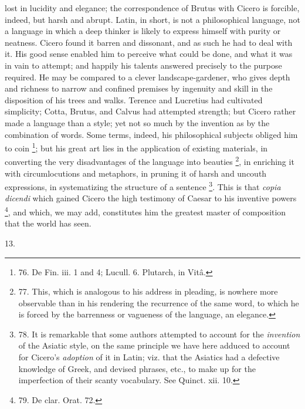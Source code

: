 lost in lucidity and elegance; the correspondence of Brutus with
Cicero is forcible, indeed, but harsh and abrupt. Latin, in short, is
not a philosophical language, not a language in which a deep thinker
is likely to express himself with purity or neatness. Cicero found it
barren and dissonant, and as such he had to deal with it. His good
sense enabled him to perceive what could be done, and what it was in
vain to attempt; and happily his talents answered precisely to the
purpose required. He may be compared to a clever landscape-gardener,
who gives depth and richness to narrow and confined premises by
ingenuity and skill in the disposition of his trees and walks. Terence
and Lucretius had cultivated simplicity; Cotta, Brutus, and Calvus had
attempted strength; but Cicero rather made a language than a style;
yet not so much by the invention as by the combination of words. Some
terms, indeed, his philosophical subjects obliged him to coin \footnote{76. De Fin. iii. 1 and 4;
Lucull. 6. Plutarch, in Vitâ.}; but his great art lies in the application of existing materials,
in converting the very disadvantages of the language into beauties \footnote{77. This, which is analogous
to his address in pleading, is nowhere more observable than in his
rendering the recurrence of the same word, to which he is forced by
the barrenness or vagueness of the language, an elegance.}, in enriching it with circumlocutions and metaphors, in
pruning it of harsh and uncouth expressions, in systematizing the
structure of a sentence \footnote{78. It is remarkable that some
authors attempted to account for the \emph{invention} of the Asiatic
style, on the same principle we have here adduced to account for
Cicero's \emph{adoption} of it in Latin; viz. that the Asiatics had
a defective knowledge of Greek, and devised phrases, etc., to make up
for the imperfection of their scanty vocabulary. See Quinct. xii. 10.}. This is that \emph{copia dicendi}
which gained Cicero the high testimony of Caesar to his inventive
powers \footnote{79. De
clar. Orat. 72.}, and which, we may add, constitutes him the greatest
master of composition that the world has seen.

13.

